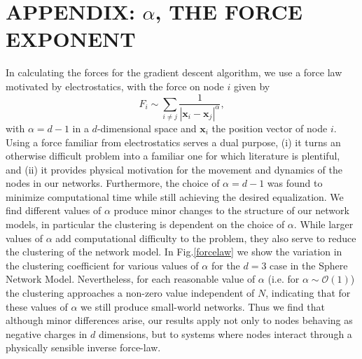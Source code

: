 \documentclass[aps,pre,reprint,superscriptaddress,amsmath,amssymb,nofootinbib]{revtex4-1}
\begin{document}
\section{APPENDIX: $\alpha$, THE FORCE EXPONENT}
\label{sub:forcelaw}
In calculating the forces for the gradient descent algorithm, we use a force law motivated by electrostatics, with the force on node $i$ given by 
\begin{equation}
F_i \sim \sum_{i \neq j} \frac{1}{|\textbf{x}_i - \textbf{x}_j|^{\alpha}}, 
\end{equation}
with $\alpha = d-1$ in a $d$-dimensional space and $\textbf{x}_i$ the position vector of node $i$.
Using a force familiar from electrostatics serves a dual purpose, (i) it turns an otherwise difficult problem into a familiar one for which literature is plentiful, and (ii) it provides physical motivation for the movement and dynamics of the nodes in our networks.
Furthermore, the choice of $\alpha = d-1$ was found to minimize computational time while still achieving the desired equalization.
We find different values of $\alpha$ produce minor changes to the structure of our network models, in particular the clustering is dependent on the choice of $\alpha$.
While larger values of $\alpha$ add computational difficulty to the problem, they also serve to reduce the clustering of the network model.
In Fig.\ref{forcelaw} we show the variation in the clustering coefficient for various values of $\alpha$ for the $d = 3$ case in the Sphere Network Model.
Nevertheless, for each reasonable value of $\alpha$ (i.e. for $\alpha \sim \mathcal O (1)$) the clustering approaches a non-zero value independent of $N$, indicating that for these values of $\alpha$ we still produce small-world networks.
Thus we find that although minor differences arise, our results apply not only to nodes behaving as negative charges in $d$ dimensions, but to systems where nodes interact through a physically sensible inverse force-law.
\end{document}
